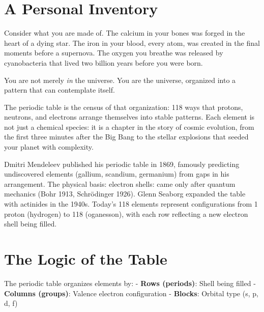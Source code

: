 \documentclass[
  11pt,
  letterpaper,
  twoside,
  openright]{book}
\begin{document}
\section{A Personal Inventory}\label{a-personal-inventory}

Consider what you are made of. The calcium in your bones was forged in
the heart of a dying star. The iron in your blood, every atom, was
created in the final moments before a supernova. The oxygen you breathe
was released by cyanobacteria that lived two billion years before you
were born.

You are not merely \emph{in} the universe. You are the universe,
organized into a pattern that can contemplate itself.

The periodic table is the census of that organization: 118 ways that
protons, neutrons, and electrons arrange themselves into stable
patterns. Each element is not just a chemical species: it is a chapter
in the story of cosmic evolution, from the first three minutes after the
Big Bang to the stellar explosions that seeded your planet with
complexity.

\begin{tcolorbox}[enhanced jigsaw, coltitle=black, colbacktitle=quarto-callout-note-color!10!white, toprule=.15mm, colframe=quarto-callout-note-color-frame, arc=.35mm, opacityback=0, bottomtitle=1mm, toptitle=1mm, breakable, colback=white, titlerule=0mm, opacitybacktitle=0.6, title=\textcolor{quarto-callout-note-color}{\faInfo}\hspace{0.5em}{Historical Context}, rightrule=.15mm, bottomrule=.15mm, leftrule=.75mm, left=2mm]

Dmitri Mendeleev published his periodic table in 1869, famously
predicting undiscovered elements (gallium, scandium, germanium) from
gaps in his arrangement. The physical basis: electron shells: came only
after quantum mechanics (Bohr 1913, Schrödinger 1926). Glenn Seaborg
expanded the table with actinides in the 1940s. Today's 118 elements
represent configurations from 1 proton (hydrogen) to 118 (oganesson),
with each row reflecting a new electron shell being filled.

\end{tcolorbox}

\section{The Logic of the Table}\label{the-logic-of-the-table}

The periodic table organizes elements by: - \textbf{Rows (periods)}:
Shell being filled - \textbf{Columns (groups)}: Valence electron
configuration - \textbf{Blocks}: Orbital type (s, p, d, f)
\end{document}
